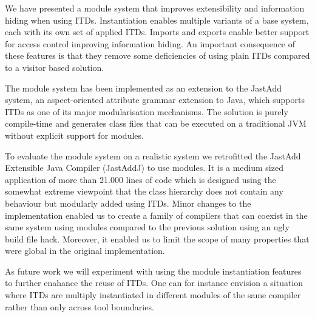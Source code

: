 We have presented a module system that improves extensibility and
information hiding when using ITDs. Instantiation enables multiple
variants of a base system, each with its own set of applied ITDs. Imports
and exports enable better support for access control improving information
hiding. An important consequence of these features is that they remove some
deficiencies of using plain ITDs compared to a visitor based solution.

The module system has been implemented as an extension to the JastAdd
system, an aspect-oriented attribute grammar extension to Java, which
supports ITDs as one of its major modularisation mechanisms. The solution
is purely compile-time and generates class files that can be executed on
a traditional JVM without explicit support for modules.

To evaluate the module system on a realistic system we retrofitted the
JastAdd Extensible Java Compiler (JastAddJ) to use modules. It is a medium
sized application of more than 21.000 lines of code which is designed using
the somewhat extreme viewpoint that the class hierarchy does not contain
any behaviour but modularly added using ITDs. Minor changes to the
implementation enabled us to create a family of compilers that can coexist
in the same system using modules compared to the previous solution using an
ugly build file hack. Moreover, it enabled us to limit the scope of many
properties that were global in the original implementation.

As future work we will experiment with using the module instantiation
features to further enahance the reuse of ITDs. One can for instance
envision a situation where ITDs are multiply instantiated in different
modules of the same compiler rather than only across tool boundaries.
